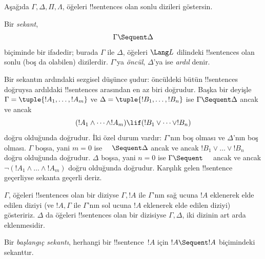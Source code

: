 

      {}
      {}


Aşağıda $\Gamma, \Delta, \Pi, \Lambda$, öğeleri !!{sentence}s olan sonlu
dizileri göstersin.

\begin{defn}[Sekant]
Bir \emph{sekant},
\[
\Gamma \Sequent \Delta
\]
biçiminde bir ifadedir; burada $\Gamma$ ile $\Delta$, öğeleri $\Lang L$
dilindeki !!{sentence}s olan sonlu (boş da olabilen) dizilerdir. $\Gamma$'ya
\emph{öncül}, $\Delta$'ya ise \emph{ardıl} denir.
\end{defn}

\begin{explain}
Bir sekantın ardındaki sezgisel düşünce şudur: öncüldeki bütün !!{sentence}s
doğruysa ardıldaki !!{sentence}s arasından en az biri doğrudur. Başka bir
deyişle $\Gamma = \tuple{!A_1, \dots, !A_m}$ ve $\Delta = \tuple{!B_1,
\dots, !B_n}$ ise $\Gamma \Sequent \Delta$ ancak ve ancak
\[
(!A_1 \land \cdots \land !A_m) \lif (!B_1 \lor \cdots \lor
!B_n)
\]
doğru olduğunda doğrudur. İki özel durum vardır: $\Gamma$'nın boş olması ve
$\Delta$'nın boş olması. $\Gamma$ boşsa, yani $m=0$ ise $\quad \Sequent
\Delta$ ancak ve ancak $!B_1 \lor \dots \lor !B_n$ doğru olduğunda
doğrudur. $\Delta$ boşsa, yani $n=0$ ise $\Gamma \Sequent \quad$ ancak ve
ancak $\lnot(!A_1 \land \dots \land !A_m)$ doğru olduğunda doğrudur.
Karşılık gelen !!{sentence} geçerliyse sekanta geçerli deriz.
\end{explain}

$\Gamma$, öğeleri !!{sentence}s olan bir diziyse $\Gamma,!A$ ile $\Gamma$'nın sağ ucuna
$!A$ eklenerek elde edilen diziyi (ve $!A,\Gamma$ ile $\Gamma$'nın sol ucuna
$!A$ eklenerek elde edilen diziyi) gösteririz. $\Delta$ da öğeleri !!{sentence}s olan bir
dizisiyse $\Gamma,\Delta$, iki dizinin art arda eklenmesidir.

\begin{defn}
Bir \emph{başlangıç sekantı}, herhangi bir !!{sentence}~$!A$ için
{$!A \Sequent !A$ biçimindeki sekanttır}.
\end{defn}

